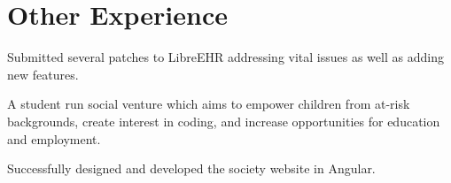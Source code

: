 \documentclass[a4paper]{resume}
\begin{document}
\begin{minipage}[t]{0.66\textwidth}
\sectionspace %



\section{Other Experience}

Submitted several patches to LibreEHR addressing vital issues as well as adding new features.

\sectionspace %

A student run social venture which aims to empower children from at-risk backgrounds, create interest in coding, and increase opportunities for education and employment.

\sectionspace %

Successfully designed and developed the society website in Angular.


\sectionspace %


\end{minipage} %








\end{document}

